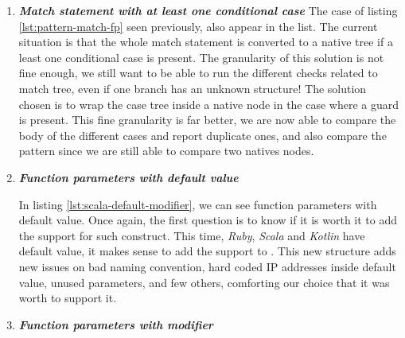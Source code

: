 \begin{enumerate}
	\item \textbf{\textit{Match statement with at least one conditional case}} \newline 
	The case of listing \ref{lst:pattern-match-fp} seen previously, also appear in the list. 
	The current situation is that the whole match statement is converted to a native tree if a least one conditional case is present. 
	The granularity of this solution is not fine enough, we still want to be able to run the different checks related to match tree, even if one branch has an unknown structure!
	The solution chosen is to wrap the case tree inside a native node in the case where a guard is present.
	This fine granularity is far better, we are now able to compare the body of the different cases and report duplicate ones, and also compare the pattern since we are still able to compare two natives nodes.
	
	\item \textbf{\textit{Function parameters with default value}} \newline 
	
	
	In listing \ref{lst:scala-default-modifier}, we can see function parameters with default value. Once again, the first question is to know if it is worth it to add the support for such construct. 
	This time, \emph{Ruby}, \emph{Scala} and \emph{Kotlin} have default value, it makes sense to add the support to \slang{}. 
	This new structure adds new issues on bad naming convention, hard coded IP addresses inside default value, unused parameters, and few others, comforting our choice that it was worth to support it.

	\item \textbf{\textit{Function parameters with modifier}} \newline 
	 
	

\end{enumerate}

